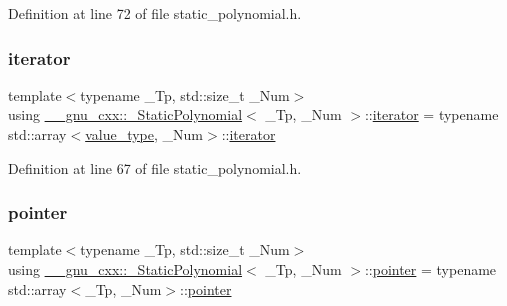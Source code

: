 Definition at line 72 of file static\+\_\+polynomial.\+h.

\mbox{\label{class____gnu__cxx_1_1__StaticPolynomial_ac52661d1503c79a7c5c90426cd0ac41e}} 
\subsubsection{\texorpdfstring{iterator}{iterator}}
{\footnotesize\ttfamily template$<$typename \+\_\+\+Tp, std\+::size\+\_\+t \+\_\+\+Num$>$ \\
using \hyperlink{class____gnu__cxx_1_1__StaticPolynomial}{\+\_\+\+\_\+gnu\+\_\+cxx\+::\+\_\+\+Static\+Polynomial}$<$ \+\_\+\+Tp, \+\_\+\+Num $>$\+::\hyperlink{class____gnu__cxx_1_1__StaticPolynomial_ac52661d1503c79a7c5c90426cd0ac41e}{iterator} =  typename std\+::array$<$\hyperlink{class____gnu__cxx_1_1__StaticPolynomial_af23110f5a002cd6caa3542df7cf35284}{value\+\_\+type}, \+\_\+\+Num$>$\+::\hyperlink{class____gnu__cxx_1_1__StaticPolynomial_ac52661d1503c79a7c5c90426cd0ac41e}{iterator}}



Definition at line 67 of file static\+\_\+polynomial.\+h.

\mbox{\label{class____gnu__cxx_1_1__StaticPolynomial_ae3f08c03fb0b4172765f8e406c16029d}} 
\subsubsection{\texorpdfstring{pointer}{pointer}}
{\footnotesize\ttfamily template$<$typename \+\_\+\+Tp, std\+::size\+\_\+t \+\_\+\+Num$>$ \\
using \hyperlink{class____gnu__cxx_1_1__StaticPolynomial}{\+\_\+\+\_\+gnu\+\_\+cxx\+::\+\_\+\+Static\+Polynomial}$<$ \+\_\+\+Tp, \+\_\+\+Num $>$\+::\hyperlink{class____gnu__cxx_1_1__StaticPolynomial_ae3f08c03fb0b4172765f8e406c16029d}{pointer} =  typename std\+::array$<$\+\_\+\+Tp, \+\_\+\+Num$>$\+::\hyperlink{class____gnu__cxx_1_1__StaticPolynomial_ae3f08c03fb0b4172765f8e406c16029d}{pointer}}




